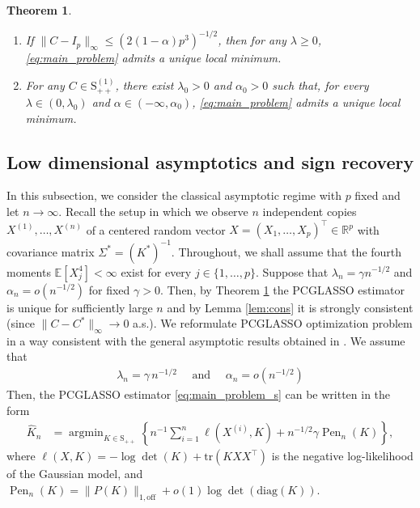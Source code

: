 \documentclass[12pt]{amsart}
\numberwithin{equation}{section}
\numberwithin{equation}{section}
\theoremstyle{plain}
\newtheorem{thm}{Theorem}
\theoremstyle{definition}
\DeclareMathOperator*{\argmin}{\arg\min}
\newcommand{\tr}{\mathrm{tr}}
\newcommand{\diag}[1]{\mathrm{diag}(#1)}
\newcommand{\Spp}{\mathrm{S}_{++}}
\newcommand{\Sppone}{\mathrm{S}_{++}^{(1)}}
\begin{document}
\begin{thm}\label{thm:unique}\ 
\begin{enumerate}
    \item[(i)] 
    If $\|C-I_p\|_{\infty} \leq (2(1-\alpha) p^3)^{-1/2}$, 
    then for any $\lambda\geq 0$, \eqref{eq:main_problem} admits a unique local minimum. 
    \item[(ii)] For any $C\in\Sppone$, there exist $\lambda_0>0$ and $\alpha_0>0$ such that, for every $\lambda\in(0,\lambda_0)$ and $\alpha\in(-\infty,\alpha_0)$, \eqref{eq:main_problem} admits a unique local minimum.
    \end{enumerate}
\end{thm}



\subsection{Low dimensional asymptotics and sign recovery}\label{sec:low_dim}

In this subsection, we consider the classical asymptotic regime with $p$ fixed and let $n\to\infty$. Recall the setup in which we observe $n$ independent copies $X^{(1)},\dots, X^{(n)}$ of a centered random vector $X=(X_1,\dots,X_p)^\top\in\mathbb{R}^p$ with covariance matrix $\Sigma^\ast=(K^\ast)^{-1}$. Throughout, we shall assume that the fourth moments $\mathbb{E}[X_j^4]<\infty$ exist for every $j\in\{1,\dots,p\}$.
Suppose that $\lambda_n=\gamma n^{-1/2}$ and $\alpha_n=o(n^{-1/2})$ for fixed $\gamma>0$. Then, by Theorem \ref{thm:unique} the PCGLASSO estimator is unique for sufficiently large $n$ and by Lemma \ref{lem:cons} it is strongly consistent (since $\|C-C^\ast\|_\infty \to 0$ a.s.). 
We reformulate PCGLASSO optimization problem in a way consistent with the general asymptotic results obtained in \cite{hejny2025asymptotic}. We assume that
\begin{align}\label{eq:tuning}
\lambda_n = \gamma\,n^{-1/2}\quad\mbox{ and } \quad\alpha_n = o(n^{-1/2})
\end{align}
Then, the PCGLASSO estimator \eqref{eq:main_problem_s} can be written in the form 
\begin{align*}
       \hat{K}_n&= \argmin_{K\in \Spp}\left\{ n^{-1}\sum_{i=1}^n\ell(X^{(i)},K)+n^{-1/2}\gamma\operatorname{Pen}_n(K)\right\},
\end{align*}
where $\ell(X,K)=-\log\det(K)+\tr(KXX^\top)$ is the negative log-likelihood of the Gaussian model, and $\operatorname{Pen}_n(K) = \| P(K)\|_{1,\mathrm{off}} + o(1) \log\det(\diag{K})$.
\end{document}
